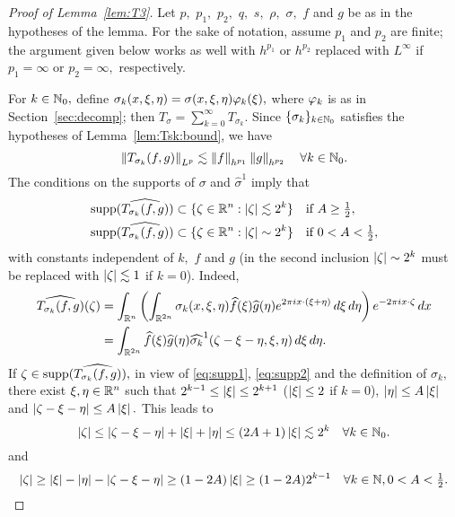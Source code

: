\begin{proof}[Proof of Lemma~\ref{lem:T3}]  Let $p,$ $p_1,$ $p_2,$ $q,$ $s,$  $\rho,$  $\sigma,$ $f$ and $g$ be as in the hypotheses of the lemma. 
For the sake of notation, assume $p_1$ and $p_2$ are finite; the argument given below works as well with $h^{p_1}$ or $h^{p_2}$ replaced with $L^\infty$ if $p_1=\infty$ or $p_2=\infty,$ respectively.

For $k\in\mathbb{N}_0,$ define $\sigma_k(x,\xi,\eta)=\sigma(x,\xi,\eta)\varphi_k(\xi),$ where $\varphi_k$ is as in Section~\ref{sec:decomp}; then $T_\sigma=\sum_{k=0}^\infty T_{\sigma_k}.$ Since  $\{\sigma_k\}_{k\in\mathbb{N}_0}$ satisfies the hypotheses of Lemma~\ref{lem:Tsk:bound}, we  have 
\begin{equation}\label{eq:Tk:bound}
\left\|T_{\sigma_k}(f,g)\right\|_{L^p}\lesssim \left\|f\right\|_{h^{p_1}}\left\|g\right\|_{h^{p_2}}\quad \forall k\in\mathbb{N}_0.
\end{equation}
 The conditions on the supports of $\sigma$ and $\widehat{\sigma}^1$ imply that 
\begin{align*}
&{\rm{supp}}(\widehat{T_{\sigma_k}(f,g)}) \subset \{\zeta\in{{\mathbb R}^n}: \left\vert \zeta \right\vert\lesssim 2^k\}\quad \text{if } A\ge{\textstyle \frac{1}{2}},\\
&{\rm{supp}}(\widehat{T_{\sigma_k}(f,g)}) \subset \{\zeta\in{{\mathbb R}^n}: \left\vert \zeta \right\vert\sim 2^k\} \quad \text{if } 0<A<{\textstyle \frac{1}{2}},
\end{align*}
with constants independent of  $k,$  $f$ and $g$ (in the second inclusion $\left\vert \zeta \right\vert\sim 2^k$ must be replaced with $\left\vert \zeta \right\vert\lesssim 1$ if $k=0$).  Indeed,
\begin{align*}
\widehat{T_{\sigma_k}(f,g)}(\zeta)&=\int_{{{\mathbb R}^n}}\left(\int_{\mathbb{R}^{2n}}\sigma_k(x,\xi,\eta)\widehat{f}(\xi)\widehat{g}(\eta)e^{2\pi i x \cdot (\xi + \eta)}\, d\xi\, d\eta\right)e^{-2\pi i x\cdot\zeta}\, dx\\
&=\int_{\mathbb{R}^{2n}} \widehat{f}(\xi)\widehat{g}(\eta) \widehat{\sigma_k}^1(\zeta-\xi-\eta,\xi,\eta)\, d\xi\, d\eta.
\end{align*}
If $\zeta\in {\rm{supp}}(\widehat{T_{\sigma_k}(f,g)}),$ in view of \eqref{eq:supp1}, \eqref{eq:supp2} and the definition of $\sigma_k,$ there exist $\xi,\eta\in{{\mathbb R}^n}$ such that $2^{k-1}\le \left\vert \xi \right\vert\le 2^{k+1}$ ($\left\vert \xi \right\vert\le 2$ if $k=0$), $\left\vert \eta \right\vert\le A\left\vert \xi \right\vert$ and $\left\vert \zeta-\xi-\eta \right\vert\le A \left\vert \xi \right\vert.$  This leads to 
\[
\left\vert \zeta \right\vert\le \left\vert \zeta-\xi-\eta \right\vert+\left\vert \xi \right\vert+\left\vert \eta \right\vert\le (2A+1) \left\vert \xi \right\vert\lesssim 2^k\quad\forall k\in\mathbb{N}_0.
\]
and
\begin{equation*}
\left\vert \zeta \right\vert\ge \left\vert \xi \right\vert-\left\vert \eta \right\vert-\left\vert \zeta-\xi-\eta \right\vert\ge(1-2A)\left\vert \xi \right\vert\ge (1-2A) 2^{k-1} \quad\forall k\in\mathbb{N}, 0<A<{\textstyle \frac{1}{2}}.
\end{equation*}

\end{proof}
